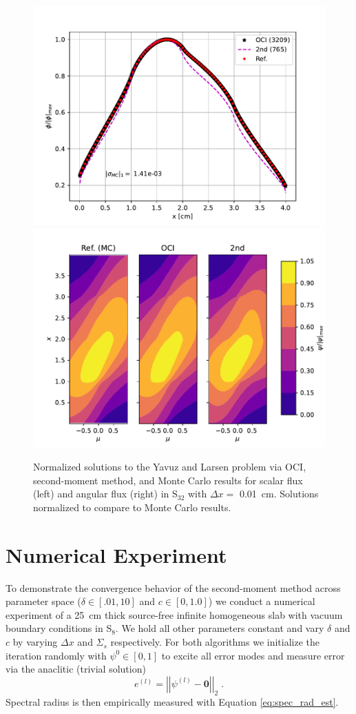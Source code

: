 \begin{figure}
    \centering
    \includegraphics[width=.75\linewidth]{figures/smm_paper/yavuz_normalized_fluxes.pdf}
    \includegraphics[width=.75\linewidth]{figures/smm_paper/yavuz_af.pdf}
    \caption{Normalized solutions to the Yavuz and Larsen problem via OCI, second-moment method, and Monte Carlo results for scalar flux (left) and angular flux (right) in S$_{32}$ with $\Delta x =$ \SI{0.01}{\centi\meter}. Solutions normalized to compare to Monte Carlo results.}
    \label{fig:yavuz}
\end{figure}

\section{Numerical Experiment}
\label{sec:num_exp}

To demonstrate the convergence behavior of the second-moment method across parameter space ($\delta \in [.01,10]$ and $c \in [0,1.0]$) we conduct a numerical experiment of a \SI{25}{\centi\meter} thick source-free infinite homogeneous slab with vacuum boundary conditions in S$_8$.
We hold all other parameters constant and vary $\delta$ and $c$ by varying $\Delta x$ and $\Sigma_s$ respectively.
For both algorithms we initialize the iteration randomly with $\psi^{0} \in [0, 1]$ to excite all error modes and measure error via the anaclitic (trivial solution)
\begin{equation}
    e^{(l)} = \left|\left|\psi^{(l)} - \bm{0}\right|\right|_2 \;.
\end{equation}
Spectral radius is then empirically measured with Equation \eqref{eq:spec_rad_est}.

